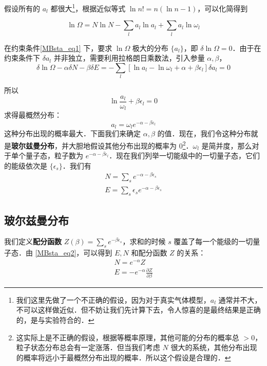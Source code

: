 假设所有的 $a_l$ 都很大\footnote{我们这里先做了一个不正确的假设，因为对于真实气体模型，$a_l$ 通常并不大，不可以这样做近似．但不妨让我们先计算下去，令人惊喜的是最终结果是正确的，是与实验符合的．}，根据近似等式 $\ln n! = n(\ln n-1)$，可以化简得到

\begin{equation}
\ln \Omega=N\ln N-\sum_l a_l\ln a_l+\sum_l a_l\ln \omega_l
\end{equation}

在约束条件\autoref{MBsta_eq1} 下，要求 $\ln \Omega$ 极大的分布 $\{a_l\}$，即 $\delta \ln \Omega =0$．由于在约束条件下 $\delta a_l$ 并非独立，需要利用拉格朗日乘数法，引入参量 $\alpha,\beta$，
\begin{equation}
\delta \ln \Omega -\alpha \delta N-\beta \delta E=-\sum_l [\ln a_l-\ln \omega_l+\alpha +\beta\epsilon_l]\delta a_l=0
\end{equation}

所以
\begin{equation}
\ln \frac{a_l}{\omega_l}+\beta\epsilon_l = 0
\end{equation}
求得最概然分布：
\begin{equation}\label{MBsta_eq5}
a_l=\omega_l e^{-\alpha -\beta \epsilon_l}
\end{equation}
这种分布出现的概率最大．下面我们来确定 $\alpha,\beta$ 的值．现在，我们令这种分布就是\textbf{玻尔兹曼分布}，并大胆地假设其他分布出现的概率为 $0$\footnote{这实际上是不正确的假设，根据等概率原理，其他可能的分布的概率总 $>0$，粒子状态分布总会有一定涨落．但当我们考虑 $N$ 很大的系统，其他分布出现的概率将远小于最概然分布出现的概率．所以这个假设是合理的．}．$\omega_l$ 是简并度，那么对于单个量子态，粒子数为 $e^{-\alpha-\beta \epsilon_l}$．现在我们列举一切能级中的一切量子态，它们的能级依次是 $\{\epsilon_s\}$．我们有
\begin{equation}\label{MBsta_eq2}
\begin{aligned}
N=\sum_s e^{-\alpha-\beta \epsilon_s}\\
E=\sum_s \epsilon_s e^{-\alpha-\beta \epsilon_s}
\end{aligned}
\end{equation}
\subsection{玻尔兹曼分布}
我们定义\textbf{配分函数} $Z(\beta)=\sum_s e^{-\beta \epsilon_s}$，求和的时候 $s$ 覆盖了每一个能级的一切量子态．由 \autoref{MBsta_eq2}，可以得到 $E,N$ 和配分函数 $Z$ 的关系：
\begin{equation}\label{MBsta_eq3}
\begin{aligned}
N=e^{-\alpha}Z\\
E=-e^{-\alpha}\frac{\partial Z}{\partial \beta}
\end{aligned}
\end{equation}

